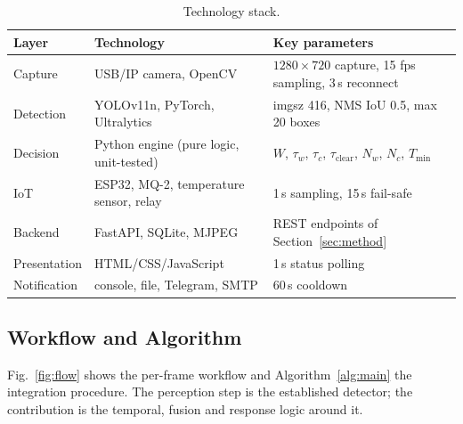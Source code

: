 \documentclass[conference]{IEEEtran}
\begin{document}
\begin{table}[t]
\caption{Technology stack.}
\label{tab:stack}
\centering
\footnotesize
\begin{tabular}{p{1.4cm}p{2.7cm}p{2.9cm}}
\toprule
\textbf{Layer} & \textbf{Technology} & \textbf{Key parameters} \\
\midrule
Capture & USB/IP camera, OpenCV & $1280\times720$ capture, 15 fps sampling, 3\,s reconnect \\
Detection & YOLOv11n, PyTorch, Ultralytics & imgsz 416, NMS IoU 0.5, max 20 boxes \\
Decision & Python engine (pure logic, unit-tested) & $W$, $\tau_w$, $\tau_c$, $\tau_{\mathrm{clear}}$, $N_w$, $N_c$, $T_{\min}$ \\
IoT & ESP32, MQ-2, temperature sensor, relay & 1\,s sampling, 15\,s fail-safe \\
Backend & FastAPI, SQLite, MJPEG & REST endpoints of Section~\ref{sec:method} \\
Presentation & HTML/CSS/JavaScript & 1\,s status polling \\
Notification & console, file, Telegram, SMTP & 60\,s cooldown \\
\bottomrule
\end{tabular}
\end{table}

\subsection{Workflow and Algorithm}
Fig.~\ref{fig:flow} shows the per-frame workflow and Algorithm~\ref{alg:main} the integration procedure. The perception step is the established detector; the contribution is the temporal, fusion and response logic around it.
\end{document}
